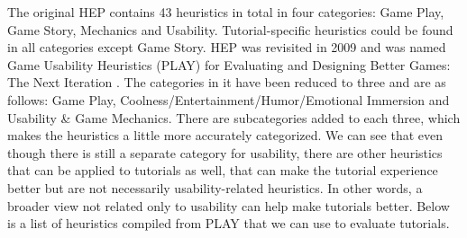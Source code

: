 The original HEP contains 43 heuristics in total in four categories: Game Play, Game Story, Mechanics and Usability. Tutorial-specific heuristics could be found in all categories except Game Story. HEP was revisited in 2009 and was named Game Usability Heuristics (PLAY) for Evaluating and Designing Better Games: The Next Iteration \cite{Desurvire2009}. The categories in it have been reduced to three and are as follows: Game Play, Coolness/Entertainment/Humor/Emotional Immersion and Usability \& Game Mechanics. There are subcategories added to each three, which makes the heuristics a little more accurately categorized. We can see that even though there is still a separate category for usability, there are other heuristics that can be applied to tutorials as well, that can make the tutorial experience better but are not necessarily usability-related heuristics. In other words, a broader view not related only to usability can help make tutorials better. Below is a list of heuristics compiled from PLAY that we can use to evaluate tutorials.

